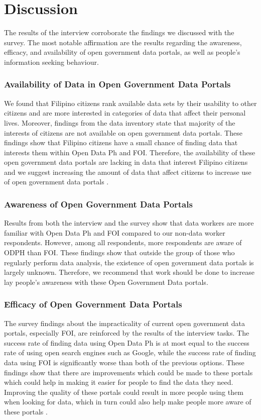 \documentclass{sigchi}
\begin{document}
\section{Discussion}
The results of the interview corroborate the findings we discussed with the survey. The most notable affirmation are the results regarding the awareness, efficacy, and availability of  open government data portals, as well as people's information seeking behaviour.

\subsubsection{Availability of Data in Open Government Data Portals}
We found that Filipino citizens rank available data sets by their usability to other citizens and are more interested in categories of data that affect their personal lives. Moreover, findings from the data inventory state that majority of the interests of citizens are not available on open government data portals. These findings show that Filipino citizens have a small chance of finding data that interests them within Open Data Ph and FOI. Therefore, the availability of these open government data portals are lacking in data that interest Filipino citizens and we suggest increasing the amount of data that affect citizens to increase use of open government data portals \cite{Puussaar2018}.

\subsubsection{Awareness of Open Government Data Portals}
Results from both the interview and the survey show that data workers are more familiar with Open Data Ph and FOI compared to our non-data worker respondents. However, among all respondents, more respondents are aware of ODPH than FOI. These findings show that outside the group of those who regularly perform data analysis, the existence of open government data portals is largely unknown. Therefore, we recommend that work should be done to increase lay people's awareness with these Open Government Data portals. 

\subsubsection{Efficacy of Open Government Data Portals}
The survey findings about the impracticality of current open government data portals, especially FOI, are reinforced by the results of the interview tasks. The success rate of finding data using Open Data Ph is at most equal to the success rate of using open search engines such as Google, while the success rate of finding data using FOI is significantly worse than both of the previous options. These findings show that there are improvements which could be made to these portals which could help in making it easier for people to find the data they need. Improving the quality of these portals could result in more people using them when looking for data, which in turn could also help make people more aware of these portals \cite{corrales2019knowledge}.
\end{document}
